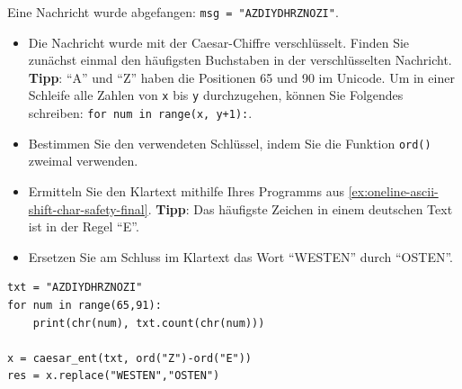 \begin{myexercise}
    Eine Nachricht wurde abgefangen: \lstinline|msg = "AZDIYDHRZNOZI"|.

    \begin{itemize}
        \item Die Nachricht wurde mit der Caesar-Chiffre verschlüsselt. Finden Sie zunächst einmal den häufigsten Buchstaben in der verschlüsselten Nachricht. \textbf{Tipp}: \enquote{A} und \enquote{Z} haben die Positionen 65 und 90 im Unicode. Um in einer Schleife alle Zahlen von \texttt{x} bis \texttt{y} durchzugehen, können Sie Folgendes schreiben: \lstinline|for num in range(x, y+1):|.

        \item Bestimmen Sie den verwendeten Schlüssel, indem Sie die Funktion \lstinline|ord()| zweimal verwenden.

        \item Ermitteln Sie den Klartext mithilfe Ihres Programms aus \cref{ex:oneline-ascii-shift-char-safety-final}. \textbf{Tipp}: Das häufigste Zeichen in einem deutschen Text ist in der Regel \enquote{E}.

        \item Ersetzen Sie am Schluss im Klartext das Wort \enquote{WESTEN} durch \enquote{OSTEN}.

    \end{itemize}
    \begin{myanswer}
        \begin{lstlisting}
txt = "AZDIYDHRZNOZI"
for num in range(65,91):
    print(chr(num), txt.count(chr(num)))

x = caesar_ent(txt, ord("Z")-ord("E"))
res = x.replace("WESTEN","OSTEN")
\end{lstlisting}
    \end{myanswer}
\end{myexercise}

